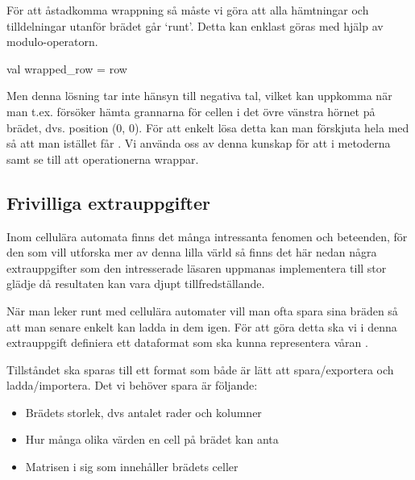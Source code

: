         
        För att åstadkomma wrappning så måste vi göra att alla hämtningar och tilldelningar utanför brädet går `runt'. Detta kan enklast göras med hjälp av modulo-operatorn.
        
\begin{Code}
val wrapped_row = row %
\end{Code}

		Men denna lösning tar inte hänsyn till negativa tal, vilket kan uppkomma när man t.ex. försöker hämta grannarna för cellen i det övre vänstra hörnet på brädet, dvs. position (0, 0). För att enkelt lösa detta kan man förskjuta hela  med  så att man istället får . Vi använda oss av denna kunskap för att i metoderna  samt  se till att operationerna wrappar.


\subsection{Frivilliga extrauppgifter}

Inom cellulära automata finns det många intressanta fenomen och beteenden, för den som vill utforska mer av denna lilla värld så finns det här nedan några extrauppgifter som den intresserade läsaren uppmanas implementera till stor glädje då resultaten kan vara djupt tillfredställande.



	När man leker runt med cellulära automater vill man ofta spara sina bräden så att man senare enkelt kan ladda in dem igen. För att göra detta ska vi i denna extrauppgift definiera ett dataformat som ska kunna representera våran .

        Tillståndet ska sparas till ett format som både är lätt att spara/exportera och ladda/importera. Det vi behöver spara är följande:
        
        \begin{itemize}
        		\item Brädets storlek, dvs antalet rader och kolumner
        		\item Hur många olika värden en cell på brädet kan anta
        		\item Matrisen i sig som innehåller brädets celler
        	\end{itemize}
        
